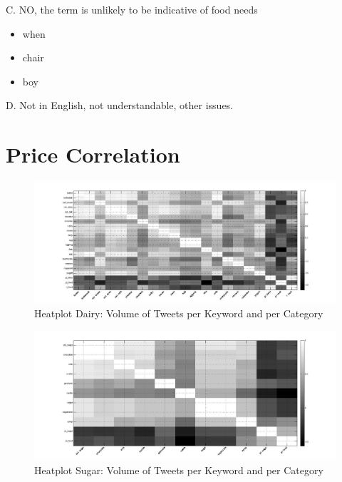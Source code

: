 C. NO, the term is unlikely to be indicative of food needs 
\begin{itemize}
  \item when
  \item chair
  \item boy
\end{itemize}

D. Not in English, not understandable, other issues.

\chapter{Price Correlation}
\label{pCorr}


\begin{figure}[H]
        \centering
         \includegraphics[width=1\textwidth ]{img/anal/dairy_test}
              
        \caption{Heatplot Dairy: Volume of Tweets per Keyword and per Category}
        \label{fig:distribution}
\end{figure}
 

\begin{figure}[H]
        \centering
         \includegraphics[width=1\textwidth ]{img/anal/sugar_black}
              
        \caption{Heatplot Sugar: Volume of Tweets per Keyword and per Category}
        \label{fig:sugar_heat}
\end{figure}

